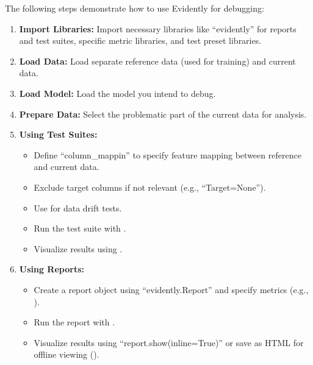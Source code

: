 \documentclass[letterpaper,12pt,notitlepage,twoside]{report}
\begin{document}
The following steps demonstrate how to use Evidently for debugging:

\begin{enumerate}
  \item \textbf{Import Libraries:} Import necessary libraries like ``evidently'' for reports and test suites, specific metric libraries, and test preset libraries.

  \item \textbf{Load Data:} Load separate reference data (used for training) and current data.

  \item \textbf{Load Model:} Load the model you intend to debug.

  \item \textbf{Prepare Data:} Select the problematic part of the current data for analysis.

  \item \textbf{Using Test Suites:}
    \begin{itemize}[noitemsep, topsep=0pt]
      \item Define ``column\_mappin'' to specify feature mapping between reference and current data.
      \item Exclude target columns if not relevant (e.g., ``Target=None'').
      \item Use  for data drift tests.
      \item Run the test suite with .
      \item Visualize results using .
    \end{itemize}

  \item \textbf{Using Reports:}
    \begin{itemize}[noitemsep, topsep=0pt]
      \item Create a report object using ``evidently.Report'' and specify metrics (e.g., ).
      \item Run the report with .
      \item Visualize results using ``report.show(inline=True)'' or save as HTML for offline viewing ().
    \end{itemize}
\end{enumerate}
\end{document}
